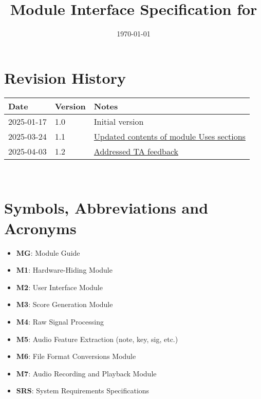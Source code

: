 \documentclass[12pt, titlepage]{article}
\begin{document}
\title{Module Interface Specification for \progname{}}

\author{\authname}

\date{\today}

\maketitle


\section{Revision History}

\begin{tabularx}{\textwidth}{p{3cm}p{2cm}X}
\toprule {\bf Date} & {\bf Version} & {\bf Notes}\\
\midrule
2025-01-17 & 1.0 & Initial version\\
2025-03-24 & 1.1 & \href{https://github.com/emilyperica/ScoreGen/issues/208}{Updated contents of module Uses sections}  \\
2025-04-03 & 1.2 & \href{https://github.com/emilyperica/ScoreGen/issues/312}{Addressed TA feedback} \\
\bottomrule
\end{tabularx}

~\newpage

\section{Symbols, Abbreviations and Acronyms}

\begin{itemize}
    \item \textbf{MG}: Module Guide
    \item \textbf{M1}: Hardware-Hiding Module
    \item \textbf{M2}: User Interface Module
    \item \textbf{M3}: Score Generation Module
    \item \textbf{M4}: Raw Signal Processing
    \item \textbf{M5}: Audio Feature Extraction (note, key, sig, etc.)
    \item \textbf{M6}: File Format Conversions Module
    \item \textbf{M7}: Audio Recording and Playback Module
    \item \textbf{SRS}: System Requirements Specifications
    
\end{itemize}
\end{document}
